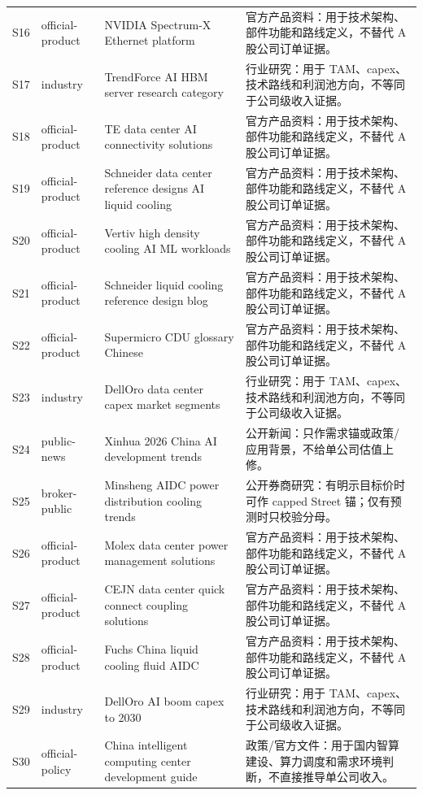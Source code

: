 \begin{exhibitbox}[来源等级表]
\begin{longtable}{L{1.0cm}L{2.3cm}L{4.0cm}L{7.0cm}}
S16 & official-product & NVIDIA Spectrum-X Ethernet platform & 官方产品资料：用于技术架构、部件功能和路线定义，不替代 A 股公司订单证据。\\
S17 & industry & TrendForce AI HBM server research category & 行业研究：用于 TAM、capex、技术路线和利润池方向，不等同于公司级收入证据。\\
S18 & official-product & TE data center AI connectivity solutions & 官方产品资料：用于技术架构、部件功能和路线定义，不替代 A 股公司订单证据。\\
S19 & official-product & Schneider data center reference designs AI liquid cooling & 官方产品资料：用于技术架构、部件功能和路线定义，不替代 A 股公司订单证据。\\
S20 & official-product & Vertiv high density cooling AI ML workloads & 官方产品资料：用于技术架构、部件功能和路线定义，不替代 A 股公司订单证据。\\
S21 & official-product & Schneider liquid cooling reference design blog & 官方产品资料：用于技术架构、部件功能和路线定义，不替代 A 股公司订单证据。\\
S22 & official-product & Supermicro CDU glossary Chinese & 官方产品资料：用于技术架构、部件功能和路线定义，不替代 A 股公司订单证据。\\
S23 & industry & DellOro data center capex market segments & 行业研究：用于 TAM、capex、技术路线和利润池方向，不等同于公司级收入证据。\\
S24 & public-news & Xinhua 2026 China AI development trends & 公开新闻：只作需求锚或政策/应用背景，不给单公司估值上修。\\
S25 & broker-public & Minsheng AIDC power distribution cooling trends & 公开券商研究：有明示目标价时可作 capped Street 锚；仅有预测时只校验分母。\\
S26 & official-product & Molex data center power management solutions & 官方产品资料：用于技术架构、部件功能和路线定义，不替代 A 股公司订单证据。\\
S27 & official-product & CEJN data center quick connect coupling solutions & 官方产品资料：用于技术架构、部件功能和路线定义，不替代 A 股公司订单证据。\\
S28 & official-product & Fuchs China liquid cooling fluid AIDC & 官方产品资料：用于技术架构、部件功能和路线定义，不替代 A 股公司订单证据。\\
S29 & industry & DellOro AI boom capex to 2030 & 行业研究：用于 TAM、capex、技术路线和利润池方向，不等同于公司级收入证据。\\
S30 & official-policy & China intelligent computing center development guide & 政策/官方文件：用于国内智算建设、算力调度和需求环境判断，不直接推导单公司收入。\\
\bottomrule
\end{longtable}
\end{exhibitbox}

